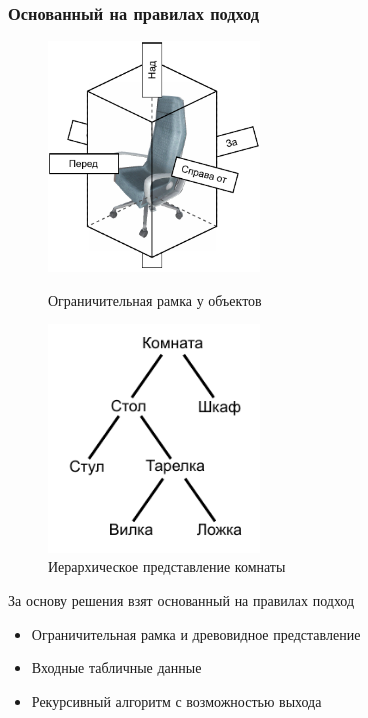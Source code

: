 \documentclass{beamer}
\begin{document}
\begin{frame}
  \frametitle{Основанный на правилах подход}
    \begin{figure}
      \centering
      \begin{minipage}{0.45\textwidth}
        \centering
        \includegraphics[width=0.5\textwidth]{pictures/collider.pdf}
        \caption{Ограничительная рамка у объектов}
      \end{minipage}
      \hfill
      \begin{minipage}{0.45\textwidth}
        \centering
        \includegraphics[width=0.5\textwidth]{pictures/child_parent_relationship.pdf}
        \caption{Иерархическое представление комнаты}
      \end{minipage}
  \end{figure}
  За основу решения взят основанный на правилах подход
  \begin{itemize}
    \item Ограничительная рамка и древовидное представление
    \item Входные табличные данные
    \item Рекурсивный алгоритм с возможностью выхода
  \end{itemize}
\end{frame}
\end{document}
